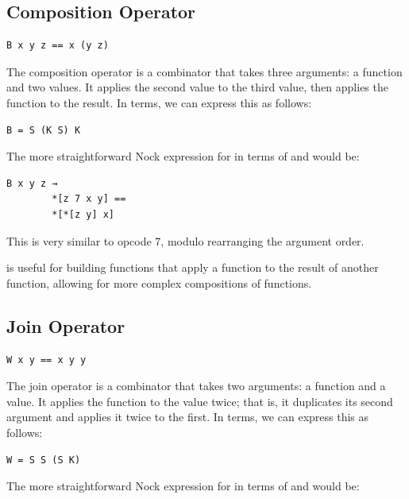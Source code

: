 \subsection{ Composition Operator}

\begin{lstlisting}[style=listingcomb,frame=tb]
B x y z == x (y z)
\end{lstlisting}

The composition operator  is a combinator that takes three arguments:  a function and two values.  It applies the second value to the third value, then applies the function to the result.  In  terms, we can express this as follows:

\begin{lstlisting}[style=listingcomb,frame=tb]
B = S (K S) K
\end{lstlisting}

The more straightforward Nock expression for  in terms of  and  would be:

\begin{lstlisting}[style=listingcomb,frame=tb]
B x y z →
        *[z 7 x y] ==
        *[*[z y] x]
\end{lstlisting}

\noindent
This is very similar to opcode 7, modulo rearranging the argument order.

 is useful for building functions that apply a function to the result of another function, allowing for more complex compositions of functions.

\subsection{ Join Operator}

\begin{lstlisting}[style=listingcomb,frame=tb]
W x y == x y y
\end{lstlisting}

The join operator  is a combinator that takes two arguments:  a function and a value.  It applies the function to the value twice; that is, it duplicates its second argument and applies it twice to the first.  In  terms, we can express this as follows:

\begin{lstlisting}[style=listingcomb,frame=tb]
W = S S (S K)
\end{lstlisting}

The more straightforward Nock expression for  in terms of  and  would be:

